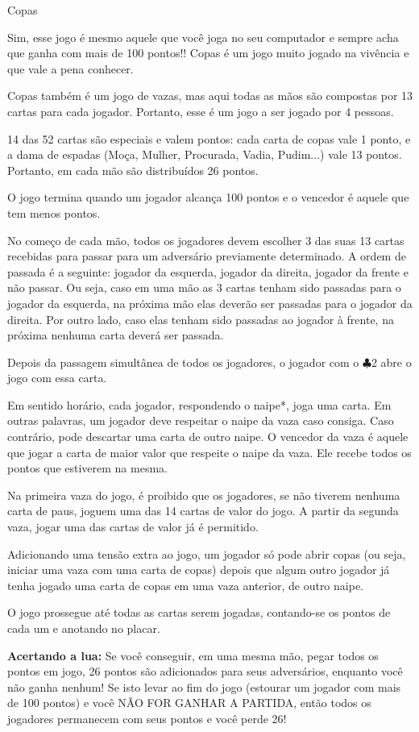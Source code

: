 \begin{subsecao}{Copas}

Sim, esse jogo é mesmo aquele que você joga no seu computador e sempre acha que ganha com
mais de 100 pontos!! Copas é um jogo muito jogado na vivência e que vale a
pena conhecer.

Copas também é um jogo de vazas, mas aqui todas as mãos são compostas por 13
cartas para cada jogador. Portanto, esse é um jogo a ser jogado por 4 pessoas.

14 das 52 cartas são especiais e valem pontos: cada carta de copas vale 1
ponto, e a dama de espadas (Moça, Mulher, Procurada, Vadia, Pudim...) vale 13
pontos. Portanto, em cada mão são distribuídos 26 pontos.

O jogo termina quando um jogador alcança 100 pontos e o vencedor é aquele que
tem menos pontos.

No começo de cada mão, todos os jogadores devem escolher 3 das suas 13 cartas
recebidas para passar para um adversário previamente determinado. A ordem de
passada é a seguinte: jogador da esquerda, jogador da direita, jogador da frente
e não passar. Ou seja, caso em uma mão as 3 cartas tenham sido passadas para o
jogador da esquerda, na próxima mão elas deverão ser passadas para o jogador da
direita. Por outro lado, caso elas tenham sido passadas ao jogador à frente, na
próxima nenhuma carta deverá ser passada.

Depois da passagem simultânea de todos os jogadores, o jogador com
o $\clubsuit$2 abre o jogo com essa carta.

Em sentido horário, cada jogador, respondendo o naipe*, joga uma carta. Em outras
palavras, um jogador deve respeitar o naipe da vaza caso consiga. Caso contrário, 
pode descartar uma carta de outro naipe. O vencedor da vaza é aquele que jogar a carta
de maior valor que respeite o naipe da vaza. Ele recebe todos os pontos que estiverem na mesma.

Na primeira vaza do jogo, é proibido que os jogadores, se não tiverem nenhuma
carta de paus, joguem uma das 14 cartas de valor do jogo. A partir da segunda
vaza, jogar uma das cartas de valor já é permitido.

Adicionando uma tensão extra ao jogo, um jogador só pode abrir copas (ou seja, iniciar
uma vaza com uma carta de copas) depois que algum outro jogador já tenha jogado uma carta
de copas em uma vaza anterior, de outro naipe.

O jogo prossegue até todas as cartas serem jogadas, contando-se os pontos de
cada um e anotando no placar.

\textbf{Acertando a lua:} Se você conseguir, em uma mesma mão, pegar todos os pontos em
jogo, 26 pontos são adicionados para seus adversários, enquanto você não ganha
nenhum! Se isto levar ao fim do jogo (estourar um jogador com mais de 100
pontos) e você NÃO FOR GANHAR A PARTIDA, então todos os jogadores permanecem
com seus pontos e você perde 26!

\end{subsecao}
